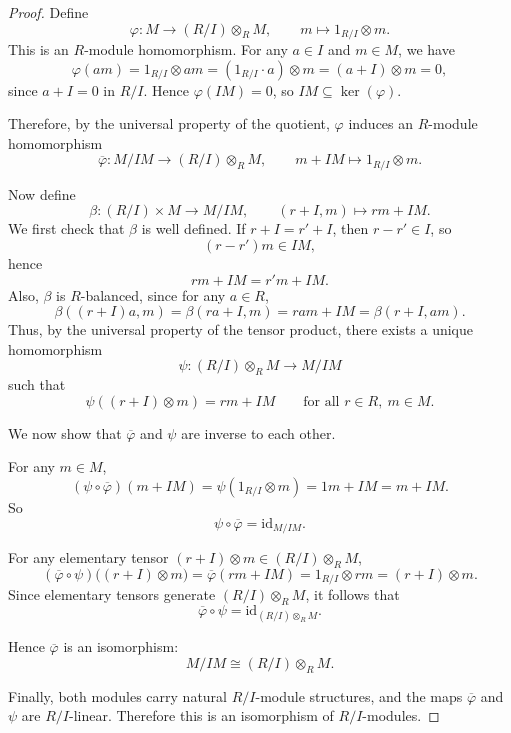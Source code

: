 \begin{proof}
    Define
    \[
        \varphi:M\longrightarrow (R/I)\otimes_R M,\qquad m\longmapsto 1_{R/I}\otimes m.
    \]
    This is an $R$-module homomorphism. For any $a\in I$ and $m\in M$, we have
    \[
        \varphi(am)=1_{R/I}\otimes am=(1_{R/I}\cdot a)\otimes m=(a+I)\otimes m=0,
    \]
    since $a+I=0$ in $R/I$. Hence $\varphi(IM)=0$, so $IM\subseteq \ker(\varphi)$.

    Therefore, by the universal property of the quotient, $\varphi$ induces an $R$-module
    homomorphism
    \[
        \overline{\varphi}:M/IM\longrightarrow (R/I)\otimes_R M,
        \qquad m+IM\longmapsto 1_{R/I}\otimes m.
    \]

    Now define
    \[
        \beta:(R/I)\times M\longrightarrow M/IM,\qquad (r+I,m)\longmapsto rm+IM.
    \]
    We first check that $\beta$ is well defined. If $r+I=r'+I$, then $r-r'\in I$, so
    \[
        (r-r')m\in IM,
    \]
    hence
    \[
        rm+IM=r'm+IM.
    \]
    Also, $\beta$ is $R$-balanced, since for any $a\in R$,
    \[
        \beta((r+I)a,m)=\beta(ra+I,m)=ram+IM=\beta(r+I,am).
    \]
    Thus, by the universal property of the tensor product, there exists a unique
    homomorphism
    \[
        \psi:(R/I)\otimes_R M\longrightarrow M/IM
    \]
    such that
    \[
        \psi((r+I)\otimes m)=rm+IM
        \qquad\text{for all }r\in R,\ m\in M.
    \]

    We now show that $\overline{\varphi}$ and $\psi$ are inverse to each other.

    For any $m\in M$,
    \[
        (\psi\circ \overline{\varphi})(m+IM)
        =\psi(1_{R/I}\otimes m)
        =1m+IM
        =m+IM.
    \]
    So
    \[
        \psi\circ \overline{\varphi}=\mathrm{id}_{M/IM}.
    \]

    For any elementary tensor $(r+I)\otimes m\in (R/I)\otimes_R M$,
    \[
        (\overline{\varphi}\circ \psi)\bigl((r+I)\otimes m\bigr)
        =\overline{\varphi}(rm+IM)
        =1_{R/I}\otimes rm
        =(r+I)\otimes m.
    \]
    Since elementary tensors generate $(R/I)\otimes_R M$, it follows that
    \[
        \overline{\varphi}\circ \psi=\mathrm{id}_{(R/I)\otimes_R M}.
    \]

    Hence $\overline{\varphi}$ is an isomorphism:
    \[
        M/IM\cong (R/I)\otimes_R M.
    \]

    Finally, both modules carry natural $R/I$-module structures, and the maps $\overline{\varphi}$ and $\psi$ are $R/I$-linear. Therefore this is an isomorphism
    of $R/I$-modules.
\end{proof}

